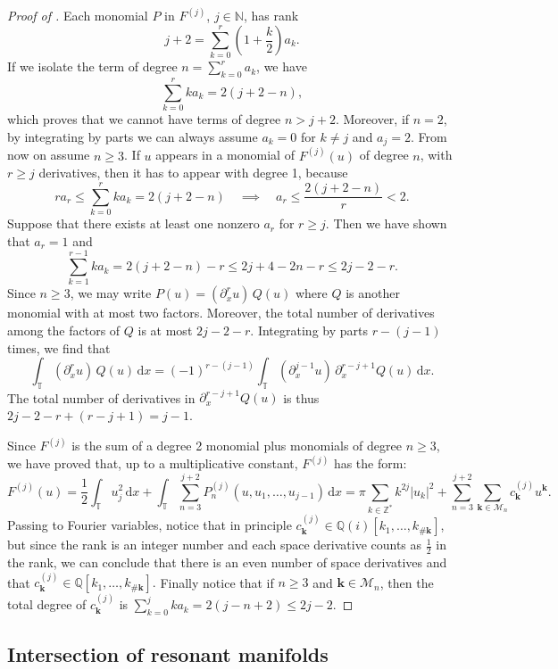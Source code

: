 \documentclass[a4paper,10pt,reqno]{article}
\theoremstyle{definition}
\theoremstyle{plain}
\theoremstyle{plain}
\theoremstyle{definition}
\theoremstyle{plain}
\theoremstyle{plain}
\theoremstyle{plain}
\theoremstyle{definition}
\theoremstyle{definition}
\def \N{\mathbb N}
\def \Z{\mathbb Z}
\def \pa{{\partial}}
\def \T{\mathbb{T}}
\def \M{\mathcal{M}}
\def \k{\bm{k}}
\begin{document}
\begin{proof}[Proof of ]
Each monomial $P$ in $F^{(j)}$, $j\in\N$, has rank
\[
j+2 = \sum_{k=0}^r \left ( 1+\frac{k}{2} \right )a_k.
\]
If we isolate the term of degree $n=\sum_{k=0}^r a_k$, we have
\[
\sum_{k=0}^r k a_k = 2(j+2-n),
\]
which proves that we cannot have terms of degree $n> j+2$.
Moreover, if $n=2$, by integrating by parts we can always assume $a_k=0$ for $k \neq j$ and $a_j=2$.
From now on assume $n \ge 3$.
If $u$ appears in a monomial of $F^{(j)}(u)$ of degree $n$, with $r \geq j$ derivatives, then it has to appear with degree 1, because 
\[
r a_r \leq \sum_{k=0}^r k a_k = 2(j+2-n) \quad \implies \quad  a_r \leq \frac{2(j+2-n)}{r}< 2.
\]
Suppose that there exists at least one nonzero $a_r$ for $r\geq j$. 
Then we have shown that $a_r=1$ and 
\[
\sum_{k=1}^{r-1} k a_k = 2(j+2-n)-r\leq 2j+4-2n -r \leq 2j-2-r.
\]
Since $n\geq 3$, we may write $P(u)=(\pa_x^r u)\, Q(u)$ where $Q$ is another monomial with at most two factors. Moreover, the total number of derivatives among the factors of $Q$ is at most $2j-2-r$. 
Integrating by parts $r-(j-1)$ times, we find that 
\[
\int_{\T} (\pa_x^r u)\, Q(u) \,\mathrm{d}x = (-1)^{r-(j-1)} \int_{\T} (\pa_x^{j-1} u)\, \pa_x^{r-j+1}Q(u) \,\mathrm{d}x.
\]
The total number of derivatives in $\pa_x^{r-j+1}Q(u)$ is thus $2j-2-r + (r-j+1) = j-1$.

Since $F^{(j)}$ is the sum of a degree 2 monomial plus monomials of degree $n\geq 3$, we have proved that, up to a multiplicative constant, $F^{(j)}$ has the form:
\[
F^{(j)}(u)  = \frac{1}{2} \int_{\T} u_j^2 \, \mathrm{d} x + \int_{\T} \sum_{n=3}^{j+2} P_n^{(j)}(u,u_1,\ldots,u_{j-1}) \, \mathrm{d} x = \pi \sum_{k \in \Z^*} k^{2j} |u_k|^2 + \sum_{n=3}^{j+2} \sum_{\k \in \M_n} c_{\k}^{(j)} u^{\k}.
\]
Passing to Fourier variables, notice that in principle $c_{\k}^{(j)} \in \mathbb{Q}(i)[k_1,\ldots,k_{\#\k}]$, but since the rank is an integer number and each space derivative counts as $\frac{1}{2}$ in the rank, we can conclude that there is an even number of space derivatives and that $c_{\k}^{(j)} \in \mathbb{Q}[k_1,\ldots,k_{\#\k}].$
Finally notice that if $n \ge 3$ and $\k \in \M_n$, then the total degree of $c_{\k}^{(j)}$ is $\sum
_{k=0}^{j} ka_k = 2(j-n+2) \le 2j-2.$
\end{proof}

\subsection{Intersection of resonant manifolds} \label{app: proof system}
\end{document}
